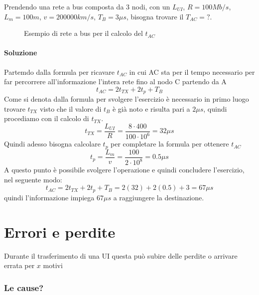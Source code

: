\begin{esempio}
  Prendendo una rete a bus composta da 3 nodi, con un $L_{UI}$, $R=100Mb/s$, $L_m=100m$, $v=200000km/s$, $T_B=3\mu s$, bisogna trovare il $T_{AC}=?$.
  \begin{figure}[!ht]
    \centering
    
    \caption{Esempio di rete a bus per il calcolo del $t_{AC}$}
    \label{fig:tac}
  \end{figure}
  \paragraph{Soluzione}
  Partemdo dalla formula per ricavare $t_{AC}$ in cui AC sta per il tempo necessario per far percorrere
  all'informazione l'intera rete fino al nodo C partendo da A
  \begin{equation*}
    t_{AC}=2t_{TX}+2t_p+T_B
  \end{equation*}
  Come si denota dalla formula per svolgere l'esercizio è necessario in primo luogo trovare $t_{TX}$ visto che
  il valore di $t_B$ è già noto e risulta pari a $2\mu s$, quindi procediamo con il calcolo di $t_{TX}$.
  \begin{equation*}
    t_{TX}=\frac{L_{UI}}{R}=\frac{8\cdot 400}{100\cdot 10^6} = 32\mu s
  \end{equation*}
  Quindi adesso bisogna calcolare $t_p$ per completare la formula per ottenere $t_{AC}$
  \begin{equation*}
    t_p=\frac{L_m}{v} = \frac{100}{2\cdot 10^8}=0.5 \mu s
  \end{equation*}
  \clearpage
  A questo punto è possibile svolgere l'operazione e quindi concludere l'esercizio, nel seguente modo:
  \begin{equation*}
    t_{AC}=2t_{TX}+2t_p+T_B= 2\left(32\right) + 2\left(0.5\right)+3= 67\mu s
  \end{equation*}
  quindi l'informazione impiega $67\mu s$ a raggiungere la destinazione.
\end{esempio}

\section{Errori e perdite}
\label{sec:erreper}
Durante il trasferimento di una UI questa può subire delle perdite o arrivare errata per $x$ motivi

\subsubsection{Le cause?}

